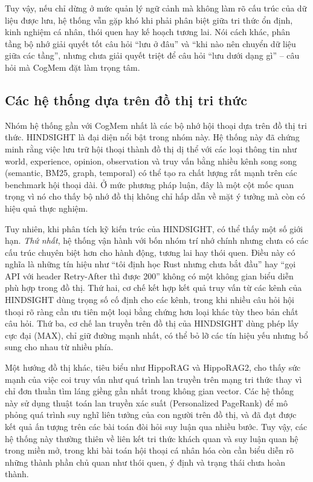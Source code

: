 \documentclass[../main.tex]{subfiles}
\begin{document}
Tuy vậy, nếu chỉ dừng ở mức quản lý ngữ cảnh mà không làm rõ cấu trúc của dữ liệu được lưu, hệ thống vẫn gặp khó khi phải phân biệt giữa tri thức ổn định, kinh nghiệm cá nhân, thói quen hay kế hoạch tương lai. Nói cách khác, phân tầng bộ nhớ giải quyết tốt câu hỏi ``lưu ở đâu'' và ``khi nào nên chuyển dữ liệu giữa các tầng'', nhưng chưa giải quyết triệt để câu hỏi ``lưu dưới dạng gì'' -- câu hỏi mà CogMem đặt làm trọng tâm.

\subsection{Các hệ thống dựa trên đồ thị tri thức}

Nhóm hệ thống gần với CogMem nhất là các bộ nhớ hội thoại dựa trên đồ thị tri thức. HINDSIGHT là đại diện nổi bật trong nhóm này. Hệ thống này đã chứng minh rằng việc lưu trữ hội thoại thành đồ thị dị thể với các loại thông tin như world, experience, opinion, observation và truy vấn bằng nhiều kênh song song (semantic, BM25, graph, temporal) có thể tạo ra chất lượng rất mạnh trên các benchmark hội thoại dài. Ở mức phương pháp luận, đây là một cột mốc quan trọng vì nó cho thấy bộ nhớ đồ thị không chỉ hấp dẫn về mặt ý tưởng mà còn có hiệu quả thực nghiệm.

Tuy nhiên, khi phân tích kỹ kiến trúc của HINDSIGHT, có thể thấy một số giới hạn. \textit{Thứ nhất}, hệ thống vận hành với bốn nhóm trí nhớ chính nhưng chưa có các cấu trúc chuyên biệt hơn cho hành động, tương lai hay thói quen. Điều này có nghĩa là những tín hiệu như ``tôi định học Rust nhưng chưa bắt đầu'' hay ``gọi API với header Retry-After thì được 200'' không có một không gian biểu diễn phù hợp trong đồ thị. Thứ hai, cơ chế kết hợp kết quả truy vấn từ các kênh của HINDSIGHT dùng trọng số cố định cho các kênh, trong khi nhiều câu hỏi hội thoại rõ ràng cần ưu tiên một loại bằng chứng hơn loại khác tùy theo bản chất câu hỏi. Thứ ba, cơ chế lan truyền trên đồ thị của HINDSIGHT dùng phép lấy cực đại (MAX), chỉ giữ đường mạnh nhất, có thể bỏ lỡ các tín hiệu yếu nhưng bổ sung cho nhau từ nhiều phía.

Một hướng đồ thị khác, tiêu biểu như HippoRAG và HippoRAG2, cho thấy sức mạnh của việc coi truy vấn như quá trình lan truyền trên mạng tri thức thay vì chỉ đơn thuần tìm láng giềng gần nhất trong không gian vector. Các hệ thống này sử dụng thuật toán lan truyền xác suất (Personalized PageRank) để mô phỏng quá trình suy nghĩ liên tưởng của con người trên đồ thị, và đã đạt được kết quả ấn tượng trên các bài toán đòi hỏi suy luận qua nhiều bước. Tuy vậy, các hệ thống này thường thiên về liên kết tri thức khách quan và suy luận quan hệ trong miền mở, trong khi bài toán hội thoại cá nhân hóa còn cần biểu diễn rõ những thành phần chủ quan như thói quen, ý định và trạng thái chưa hoàn thành.
\end{document}
